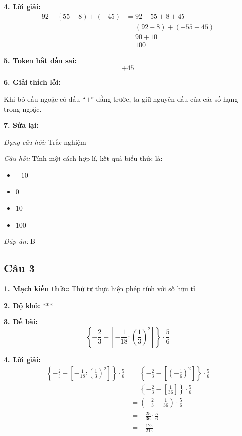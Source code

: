 \noindent\textbf{4. Lời giải:}
\begin{align*}
92-(55-8)+(-45)
    &= 92-55+8+45 \\
    &= (92+8)+(-55+45) \\
    &= 90+10 \\
    &= 100
\end{align*}

\noindent\textbf{5. Token bắt đầu sai:}
\[
+45
\]

\noindent\textbf{6. Giải thích lỗi:}

Khi bỏ dấu ngoặc có dấu ``$+$'' đằng trước, ta giữ nguyên dấu của các số hạng trong ngoặc.

\noindent\textbf{7. Sửa lại:}

\textit{Dạng câu hỏi:} Trắc nghiệm

\textit{Câu hỏi:} Tính một cách hợp lí, kết quả biểu thức là:

\begin{itemize}
    \item[A.] $-10$
    \item[B.] $0$
    \item[C.] $10$
    \item[D.] $100$
\end{itemize}

\textit{Đáp án:} B

\subsection*{Câu 3}

\noindent\textbf{1. Mạch kiến thức:} Thứ tự thực hiện phép tính với số hữu tỉ

\noindent\textbf{2. Độ khó:} ***

\noindent\textbf{3. Đề bài:}
\[
\left\{
-\frac{2}{3}
-
\left[
-\frac{1}{18}:\left(\frac{1}{3}\right)^2
\right]
\right\}\cdot\frac{5}{6}
\]

\noindent\textbf{4. Lời giải:}
\begin{align*}
\left\{
-\frac{2}{3}
-
\left[
-\frac{1}{18}:\left(\frac{1}{3}\right)^2
\right]
\right\}\cdot\frac{5}{6}
&=
\left\{
-\frac{2}{3}
-
\left[
\left(-\frac{1}{6}\right)^2
\right]
\right\}\cdot\frac{5}{6} \\
&=
\left\{
-\frac{2}{3}
-
\left[
\frac{1}{36}
\right]
\right\}\cdot\frac{5}{6} \\
&=
\left(
-\frac{2}{3}-\frac{1}{36}
\right)\cdot\frac{5}{6} \\
&=
-\frac{25}{36}\cdot\frac{5}{6} \\
&=
-\frac{125}{216}
\end{align*}

